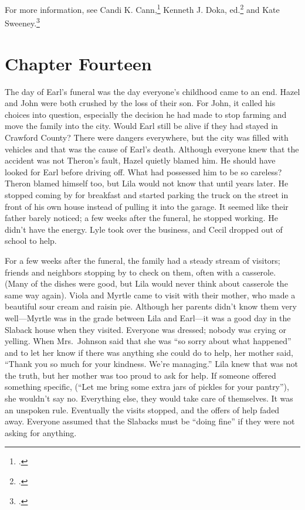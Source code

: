 \documentclass[
  american,
  letterpaper,
]{book}
\begin{document}
For more information, see Candi K. Cann,\footnote{.} Kenneth J. Doka,
ed.\footnote{.} and
Kate Sweeney.\footnote{.}


\chapter{Chapter Fourteen}\label{chapter-fourteen}

The day of Earl's funeral was the day everyone's childhood came to an
end. Hazel and John were both crushed by the loss of their son. For
John, it called his choices into question, especially the decision he
had made to stop farming and move the family into the city. Would Earl
still be alive if they had stayed in Crawford County? There were dangers
everywhere, but the city was filled with vehicles and that was the cause
of Earl's death. Although everyone knew that the accident was not
Theron's fault, Hazel quietly blamed him. He should have looked for Earl
before driving off. What had possessed him to be so careless? Theron
blamed himself too, but Lila would not know that until years later. He
stopped coming by for breakfast and started parking the truck on the
street in front of his own house instead of pulling it into the garage.
It seemed like their father barely noticed; a few weeks after the
funeral, he stopped working. He didn't have the energy. Lyle took over
the business, and Cecil dropped out of school to help.

For a few weeks after the funeral, the family had a steady stream of
visitors; friends and neighbors stopping by to check on them, often with
a casserole. (Many of the dishes were good, but Lila would never think
about casserole the same way again). Viola and Myrtle came to visit with
their mother, who made a beautiful sour cream and raisin pie. Although
her parents didn't know them very well---Myrtle was in the grade between
Lila and Earl---it was a good day in the Slaback house when they
visited. Everyone was dressed; nobody was crying or yelling. When
Mrs.~Johnson said that she was ``so sorry about what happened'' and to
let her know if there was anything she could do to help, her mother
said, ``Thank you so much for your kindness. We're managing.'' Lila knew
that was not the truth, but her mother was too proud to ask for help. If
someone offered something specific, (``Let me bring some extra jars of
pickles for your pantry''), she wouldn't say no. Everything else, they
would take care of themselves. It was an unspoken rule. Eventually the
visits stopped, and the offers of help faded away. Everyone assumed that
the Slabacks must be ``doing fine'' if they were not asking for
anything.
\end{document}
